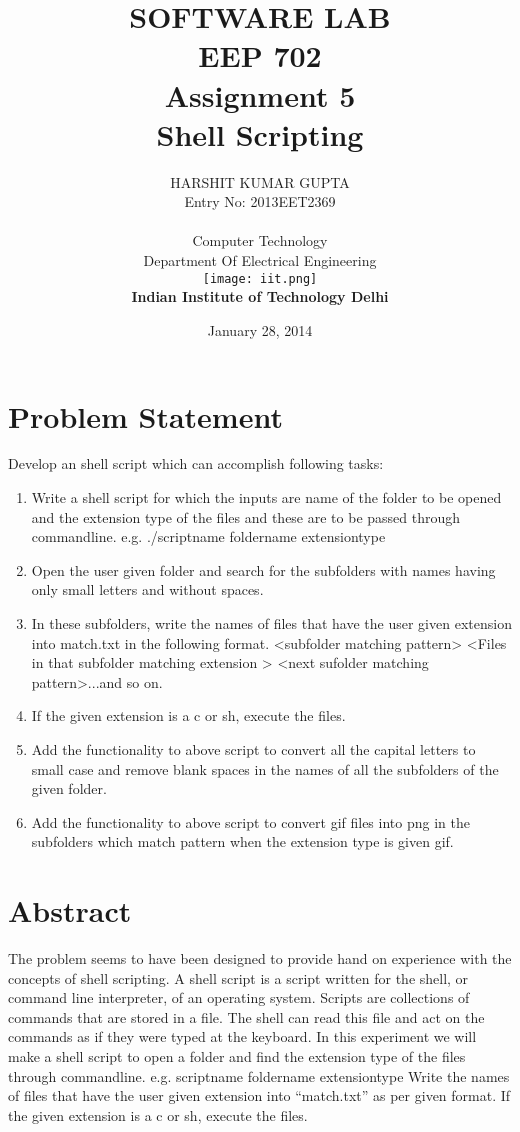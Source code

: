 \documentclass [12 pt ]{article}
\title{\textbf{\huge{SOFTWARE LAB\\[0.5 cm]EEP 702}\\[1.5 cm] Assignment 5\\[0.5cm]Shell Scripting\\[0.5 cm]}}%
\author{ {HARSHIT KUMAR GUPTA } \\Entry No: 2013EET2369\\[0.4 cm] \\[0.4cm] Computer Technology\\ Department Of Electrical Engineering\\[1cm]
\texttt{[image: iit.png]}
\\[0.5 cm] \textbf{Indian Institute of Technology Delhi}}
\date{January 28, 2014}
\begin{document}
\maketitle
\newpage
\tableofcontents
\newpage 

 \section{Problem Statement}
 Develop an shell script which can accomplish following tasks:   
\begin{enumerate}

\item Write a shell script for which the inputs are name of the folder to be opened and the extension type of the files and these are to
be passed through commandline. e.g. ./scriptname foldername extensiontype
\item Open the user given folder and search for the subfolders with names having only small letters and without
spaces.
\item In these subfolders, write the names of files that have the user given extension into match.txt in the
following format.
<subfolder matching pattern>
<Files in that subfolder matching extension >
<next sufolder matching pattern>...and so on.
\item If the given extension is a c or sh, execute the files.
\item Add the functionality to above script to convert all the capital letters to small case and remove blank spaces in the names of all the subfolders
of the given folder.
\item Add the functionality to above script to convert gif files into png in the subfolders which match pattern when the extension type is given gif.




\end{enumerate}
    
 \newpage
 
\section {Abstract}
The problem seems to have been designed to provide hand on experience with the concepts of shell scripting. 
A shell script is a script written for the shell, or command line interpreter, of an operating system.
Scripts are collections of commands that are stored in a file. The shell can read this file and act on the commands as if they were typed at the keyboard.
In this experiment we will make a shell script to open a folder and find the extension type of the files through commandline. e.g. 
scriptname foldername extensiontype
Write the names of files that have the user given extension into “match.txt” as per given format.
If the given extension is a c or sh, execute the files.
\end{document}
